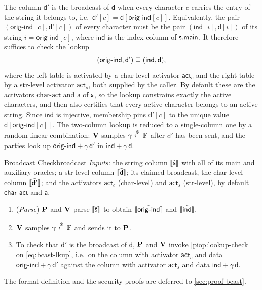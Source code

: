  The column $\mathsf{d}'$ is the broadcast of $\mathsf{d}$ when every character $c$ carries the entry of the string it belongs to, i.e.\ $\mathsf{d}'[c] = \mathsf{d}[\mathsf{orig\text{-}ind}[c]]$. Equivalently, the pair $(\mathsf{orig\text{-}ind}[c], \mathsf{d}'[c])$ of every character must be the pair $(\mathsf{ind}[i], \mathsf{d}[i])$ of its string $i = \mathsf{orig\text{-}ind}[c]$, where $\mathsf{ind}$ is the index column of $\mathsf{s}.\mathsf{main}$. It therefore suffices to check the lookup
\begin{equation}
  \label{eq:bcast-lkup}
  (\mathsf{orig\text{-}ind}, \mathsf{d}') \sqsubseteq (\mathsf{ind}, \mathsf{d}),
\end{equation}
where the left table is activated by a char-level activator $\mathsf{act}_c$ and the right table by a str-level activator $\mathsf{act}_s$, both supplied by the caller. By default these are the activators $\mathsf{char\text{-}act}$ and $\mathsf{a}$ of $\mathsf{s}$, so the lookup constrains exactly the active characters, and then also certifies that every active character belongs to an active string. Since $\mathsf{ind}$ is injective, membership pins $\mathsf{d}'[c]$ to the unique value $\mathsf{d}[\mathsf{orig\text{-}ind}[c]]$. The two-column lookup is reduced to a single-column one by a random linear combination: $\bf{V}$ samples $\gamma \overset{\$}{\leftarrow} \mathbb{F}$ after $\mathsf{d}'$ has been sent, and the parties look up $\mathsf{orig\text{-}ind} + \gamma\,\mathsf{d}'$ in $\mathsf{ind} + \gamma\,\mathsf{d}$.

\begin{DefinePIOP}{Broadcast Check}{broadcast}
  \emph{Inputs:} the string column $\llbracket\hat{\mathsf{s}}\rrbracket$ with all of its main and auxiliary oracles; a str-level column $\llbracket\tilde{\mathsf{d}}\rrbracket$; its claimed broadcast, the char-level column $\llbracket\tilde{\mathsf{d}'}\rrbracket$; and the activators $\mathsf{act}_c$ (char-level) and $\mathsf{act}_s$ (str-level), by default $\mathsf{char\text{-}act}$ and $\mathsf{a}$.
  \begin{enumerate}[nosep]
    \item (\emph{Parse}) $\bf{P}$ and $\bf{V}$ parse $\llbracket\hat{\mathsf{s}}\rrbracket$ to obtain $\llbracket\tilde{\mathsf{orig\text{-}ind}}\rrbracket$ and $\llbracket\tilde{\mathsf{ind}}\rrbracket$.
    \item $\bf{V}$ samples $\gamma \overset{\$}{\leftarrow} \mathbb{F}$ and sends it to $\bf{P}$.
    \item To check that $\mathsf{d}'$ is the broadcast of $\mathsf{d}$, $\bf{P}$ and $\bf{V}$ invoke \cref{piop:lookup-check} on \cref{eq:bcast-lkup}, i.e.\ on the column with activator $\mathsf{act}_c$ and data $\mathsf{orig\text{-}ind} + \gamma\,\mathsf{d}'$ against the column with activator $\mathsf{act}_s$ and data $\mathsf{ind} + \gamma\,\mathsf{d}$.
  \end{enumerate}
\end{DefinePIOP}
The formal definition and the security proofs are deferred to \cref{sec:proof-bcast}.

